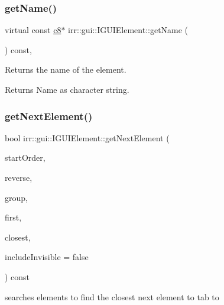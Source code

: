 \subsubsection{\texorpdfstring{get\+Name()}{getName()}}
{\footnotesize\ttfamily virtual const \hyperlink{namespaceirr_a9395eaea339bcb546b319e9c96bf7410}{c8}$\ast$ irr\+::gui\+::\+I\+G\+U\+I\+Element\+::get\+Name (\begin{DoxyParamCaption}{ }\end{DoxyParamCaption}) const\hspace{0.3cm}{\ttfamily [inline]}, {\ttfamily [virtual]}}



Returns the name of the element. 

\begin{DoxyReturn}{Returns}
Name as character string. 
\end{DoxyReturn}
\mbox{\label{classirr_1_1gui_1_1IGUIElement_aaf461c857c9005d310635e56dc384ed4}} 
\subsubsection{\texorpdfstring{get\+Next\+Element()}{getNextElement()}}
{\footnotesize\ttfamily bool irr\+::gui\+::\+I\+G\+U\+I\+Element\+::get\+Next\+Element (\begin{DoxyParamCaption}\item[{\hyperlink{namespaceirr_ac66849b7a6ed16e30ebede579f9b47c6}{s32}}]{start\+Order,  }\item[{bool}]{reverse,  }\item[{bool}]{group,  }\item[{\hyperlink{classirr_1_1gui_1_1IGUIElement}{I\+G\+U\+I\+Element} $\ast$\&}]{first,  }\item[{\hyperlink{classirr_1_1gui_1_1IGUIElement}{I\+G\+U\+I\+Element} $\ast$\&}]{closest,  }\item[{bool}]{include\+Invisible = {\ttfamily false} }\end{DoxyParamCaption}) const\hspace{0.3cm}{\ttfamily [inline]}}



searches elements to find the closest next element to tab to 


